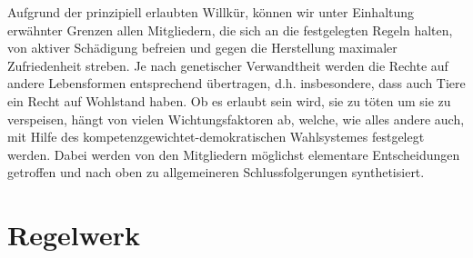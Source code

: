 Aufgrund der prinzipiell erlaubten Willkür, können wir unter Einhaltung erwähnter Grenzen allen Mitgliedern, die sich an die festgelegten Regeln halten, von aktiver Schädigung befreien und gegen die Herstellung maximaler Zufriedenheit streben. Je nach genetischer Verwandtheit werden die Rechte auf andere Lebensformen entsprechend übertragen, d.h. insbesondere, dass auch Tiere ein Recht auf Wohlstand haben. Ob es erlaubt sein wird, sie zu töten um sie zu verspeisen, hängt von vielen Wichtungsfaktoren ab, welche, wie alles andere auch, mit Hilfe des kompetenzgewichtet-demokratischen Wahlsystemes festgelegt werden. Dabei werden von den Mitgliedern möglichst elementare Entscheidungen getroffen und nach oben zu allgemeineren Schlussfolgerungen synthetisiert.

\section{Regelwerk}\label{sec:rulebook}
